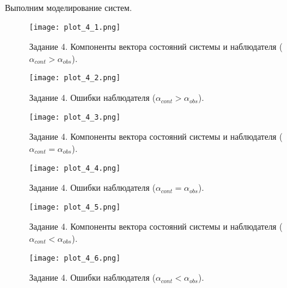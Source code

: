 Выполним моделирование систем.
\begin{figure}[h]
    \centering
    \texttt{[image: plot\_4\_1.png]}
    \caption{\label{fig:The-caption-1}Задание 4. Компоненты вектора состояний системы и наблюдателя ($\alpha_{cont} > \alpha_{obs}$).}
\end{figure}
\begin{figure}[]
    \centering
    \texttt{[image: plot\_4\_2.png]}
    \caption{\label{fig:The-caption-1}Задание 4. Ошибки наблюдателя ($\alpha_{cont} > \alpha_{obs}$).}
\end{figure}
\begin{figure}[]
    \centering
    \texttt{[image: plot\_4\_3.png]}
    \caption{\label{fig:The-caption-1}Задание 4. Компоненты вектора состояний системы и наблюдателя ($\alpha_{cont} = \alpha_{obs}$).}
\end{figure}
\begin{figure}[]
    \centering
    \texttt{[image: plot\_4\_4.png]}
    \caption{\label{fig:The-caption-1}Задание 4. Ошибки наблюдателя ($\alpha_{cont} = \alpha_{obs}$).}
\end{figure}
\begin{figure}[]
    \centering
    \texttt{[image: plot\_4\_5.png]}
    \caption{\label{fig:The-caption-1}Задание 4. Компоненты вектора состояний системы и наблюдателя ($\alpha_{cont} < \alpha_{obs}$).}
\end{figure}
\begin{figure}[]
    \centering
    \texttt{[image: plot\_4\_6.png]}
    \caption{\label{fig:The-caption-1}Задание 4. Ошибки наблюдателя ($\alpha_{cont} < \alpha_{obs}$).}
\end{figure}
\pagebreak

